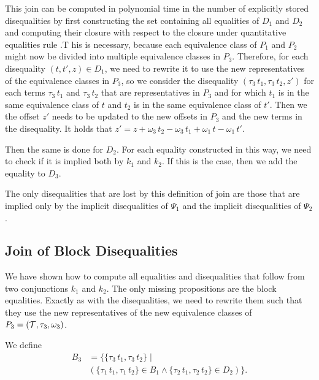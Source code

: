 This join can be computed in polynomial time in the number of explicitly stored disequalities by first constructing the set containing all equalities of $D_1$ and $D_2$
and computing their closure with respect to the closure under quantitative equalities rule .T
his is necessary, because each equivalence class of $P_1$ and $P_2$ might now be divided into multiple equivalence classes in $P_3$.
Therefore, for each disequality $(t, t', z) \in D_1$,
we need to rewrite it to use the new representatives of the equivalence classes in $P_3$,
so we consider the disequality $(\tau_3\,t_1, \tau_3\,t_2, z')$
for each terms $\tau_3\,t_1$ and $\tau_3\,t_2$ that are representatives in $P_3$ and for
which $t_1$ is in the same equivalence class of $t$ and $t_2$ is in the same equivalence class of $t'$.
Then we the offset $z'$ needs to be updated to the new offsets in $P_3$ and the new terms in the disequality.
It holds that $z' = z + \omega_3\,t_2 - \omega_3\,t_1 + \omega_1\,t - \omega_1\,t'$.

Then the same is done for $D_2$.
For each equality constructed in this way, we need to check if it is implied both by $k_1$ and $k_2$.
If this is the case, then we add the equality to $D_3$.

The only disequalities that are lost by this definition of join are those that are implied only by the implicit disequalities of $\Psi_1$ and the implicit disequalities of $\Psi_2$.

\subsection{Join of Block Disequalities}
We have shown how to compute all equalities and disequalities that follow from two conjunctions $k_1$ and $k_2$.
The only missing propositions are the block equalities.
Exactly as with the disequalities, we need to rewrite them such that they use the new representatives of the new equivalence classes of $P_3 = (\mathcal{T}, \tau_3, \omega_3)$.

We define
\[
    \begin{array}{ll}
        B_3 & = \{\{\tau_3\,t_1, \tau_3\,t_2\}  \mid                                                \\
            & (\{\tau_1\,t_1, \tau_1\,t_2\} \in B_1 \land \{\tau_2\,t_1, \tau_2\,t_2\} \in D_2) \}.
    \end{array}
\]

